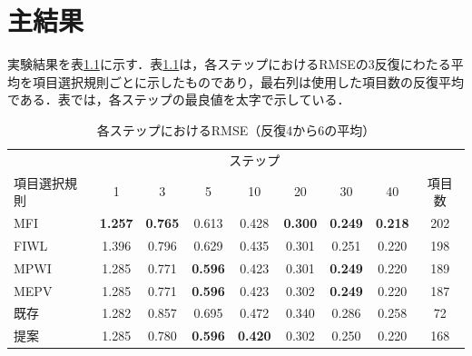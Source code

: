 \documentclass[a4paper,12pt,oneside,openany]{jsbook}
\begin{document}
\chapter{主結果}\label{sec:expresult}

実験結果を表\ref{tab:main}に示す．表\ref{tab:main}は，各ステップにおけるRMSEの3反復にわたる平均を項目選択規則ごとに示したものであり，最右列は使用した項目数の反復平均である．表では，各ステップの最良値を太字で示している．

\begin{table}[t]
\centering
\caption{各ステップにおけるRMSE（反復4から6の平均）}
\label{tab:main}
\footnotesize
\setlength{\tabcolsep}{2pt}
\begin{tabular}{lcccccccc}
\hline
 & \multicolumn{7}{c}{ステップ} & \\
項目選択規則 & 1 & 3 & 5 & 10 & 20 & 30 & 40 & 項目数\\
\hline
MFI & \textbf{1.257} & \textbf{0.765} & 0.613 & 0.428 & \textbf{0.300} & \textbf{0.249} & \textbf{0.218} & 202\\
FIWL & 1.396 & 0.796 & 0.629 & 0.435 & 0.301 & 0.251 & 0.220 & 198\\
MPWI & 1.285 & 0.771 & \textbf{0.596} & 0.423 & 0.301 & \textbf{0.249} & 0.220 & 189\\
MEPV & 1.285 & 0.771 & \textbf{0.596} & 0.423 & 0.302 & \textbf{0.249} & 0.220 & 187\\
既存 & 1.282 & 0.857 & 0.695 & 0.472 & 0.340 & 0.286 & 0.258 & 72\\
提案 & 1.285 & 0.780 & \textbf{0.596} & \textbf{0.420} & 0.302 & 0.250 & 0.220 & 168\\
\hline
\end{tabular}
\end{table}
\end{document}
